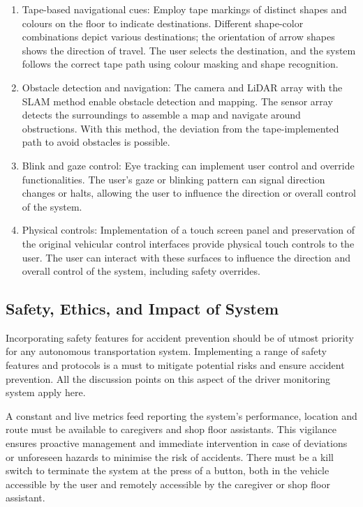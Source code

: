 \documentclass[9pt,conference]{IEEEtran}
\begin{document}
\begin{enumerate}[label=\alph*.]
    \item Tape-based navigational cues: Employ tape markings of distinct shapes and colours on the floor to indicate destinations. Different shape-color combinations depict various destinations; the orientation of arrow shapes shows the direction of travel. The user selects the destination, and the system follows the correct tape path using colour masking and shape recognition.
    \item Obstacle detection and navigation: The camera and LiDAR array with the SLAM method enable obstacle detection and mapping. The sensor array detects the surroundings to assemble a map and navigate around obstructions. With this method, the deviation from the tape-implemented path to avoid obstacles is possible.
    \item Blink and gaze control: Eye tracking can implement user control and override functionalities. The user's gaze or blinking pattern can signal direction changes or halts, allowing the user to influence the direction or overall control of the system.
    \item Physical controls: Implementation of a touch screen panel and preservation of the original vehicular control interfaces provide physical touch controls to the user. The user can interact with these surfaces to influence the direction and overall control of the system, including safety overrides.
\end{enumerate}

\subsection{Safety, Ethics, and Impact of System}
Incorporating safety features for accident prevention should be of utmost priority for any autonomous transportation system. Implementing a range of safety features and protocols is a must to mitigate potential risks and ensure accident prevention. All the discussion points on this aspect of the driver monitoring system apply here.

A constant and live metrics feed reporting the system's performance, location and route must be available to caregivers and shop floor assistants. This vigilance ensures proactive management and immediate intervention in case of deviations or unforeseen hazards to minimise the risk of accidents. There must be a kill switch to terminate the system at the press of a button, both in the vehicle accessible by the user and remotely accessible by the caregiver or shop floor assistant.
\end{document}
